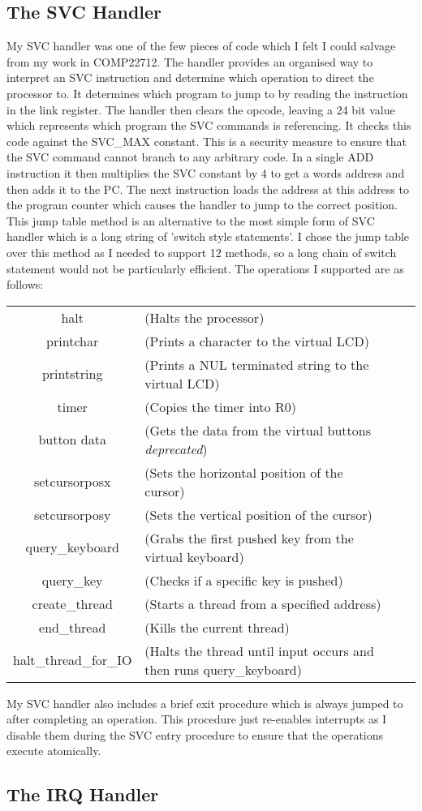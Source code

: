 \subsection{The SVC Handler}
My SVC handler was one of the few pieces of code which I felt I could salvage from my work in COMP22712. The handler provides an organised way to interpret an SVC instruction and determine which operation to direct the processor to. It determines which program to jump to by reading the instruction in the link register. The handler then clears the opcode, leaving a 24 bit value which represents which program the SVC commands is referencing. It checks this code against the SVC\_MAX constant. This is a security measure to ensure that the SVC command cannot branch to any arbitrary code. In a single ADD instruction it then multiplies the SVC constant by 4 to get a words address and then adds it to the PC. The next instruction loads the address at this address to the program counter which causes the handler to jump to the correct position. This jump table method is an alternative to the most simple form of SVC handler which is a long string of 'switch style statements'. I chose the jump table over this method as I needed to support 12 methods, so a long chain of switch statement would not be particularly efficient. The operations I supported are as follows:

\begin{tabular}{cl cl}
	halt & (Halts the processor) \\
	printchar & (Prints a character to the virtual LCD) \\
	printstring & (Prints a NUL terminated string to the virtual LCD) \\
	timer & (Copies the timer into R0) \\
	button data  & (Gets the data from the virtual buttons \textit{deprecated}) \\
	setcursorposx & (Sets the horizontal position of the cursor) \\
	setcursorposy & (Sets the vertical position of the cursor) \\
	query\_keyboard & (Grabs the first pushed key from the virtual keyboard) \\
	query\_key & (Checks if a specific key is pushed) \\
	create\_thread & (Starts a thread from a specified address) \\
	end\_thread & (Kills the current thread) \\
	halt\_thread\_for\_IO & (Halts the thread until input occurs and then runs query\_keyboard) \\
\end{tabular} 

My SVC handler also includes a brief exit procedure which is always jumped to after completing an operation. This procedure just re-enables interrupts as I disable them during the SVC entry procedure to ensure that the operations execute atomically. 
\subsection{The IRQ Handler}
